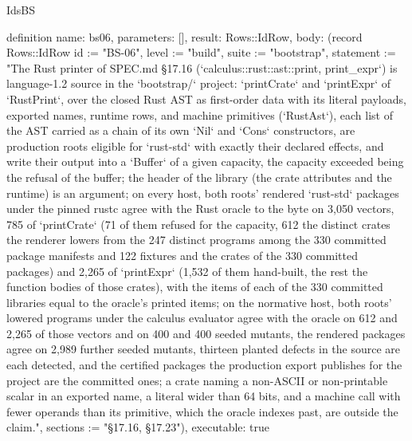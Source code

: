 \begin{lexlean}{IdsBS}
\begin{semanticmodule}
definition{
  name: bs06,
  parameters: [],
  result: Rows::IdRow,
  body: (record Rows::IdRow {id := "BS-06", level := "build", suite := "bootstrap", statement := "The Rust printer of SPEC.md §17.16 (`calculus::rust::ast::{print, print_expr}`) is language-1.2 source in the `bootstrap/` project: `printCrate` and `printExpr` of `RustPrint`, over the closed Rust AST as first-order data with its literal payloads, exported names, runtime rows, and machine primitives (`RustAst`), each list of the AST carried as a chain of its own `Nil` and `Cons` constructors, are production roots eligible for `rust-std` with exactly their declared effects, and write their output into a `Buffer` of a given capacity, the capacity exceeded being the refusal of the buffer; the header of the library (the crate attributes and the runtime) is an argument; on every host, both roots' rendered `rust-std` packages under the pinned rustc agree with the Rust oracle to the byte on 3,050 vectors, 785 of `printCrate` (71 of them refused for the capacity, 612 the distinct crates the renderer lowers from the 247 distinct programs among the 330 committed package manifests and 122 fixtures and the crates of the 330 committed packages) and 2,265 of `printExpr` (1,532 of them hand-built, the rest the function bodies of those crates), with the items of each of the 330 committed libraries equal to the oracle's printed items; on the normative host, both roots' lowered programs under the calculus evaluator agree with the oracle on 612 and 2,265 of those vectors and on 400 and 400 seeded mutants, the rendered packages agree on 2,989 further seeded mutants, thirteen planted defects in the source are each detected, and the certified packages the production export publishes for the project are the committed ones; a crate naming a non-ASCII or non-printable scalar in an exported name, a literal wider than 64 bits, and a machine call with fewer operands than its primitive, which the oracle indexes past, are outside the claim.", sections := "§17.16, §17.23"}),
  executable: true
}


\end{semanticmodule}
\end{lexlean}
